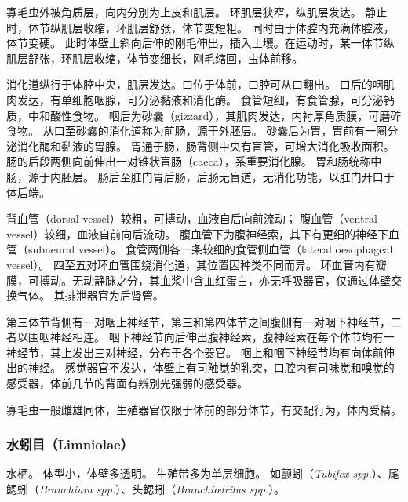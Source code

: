 \documentclass[11pt]{article}
\begin{document}
\newline

寡毛虫外被角质层，向内分别为上皮和肌层。
环肌层狭窄，纵肌层发达。
静止时，体节纵肌层收缩，环肌层舒张，体节变短粗。
同时由于体腔内充满体腔液，体节变硬。
此时体壁上斜向后伸的刚毛伸出，插入土壤。在运动时，某一体节纵肌层舒张，环肌层收缩，体节变细长，刚毛缩回，虫体前移。

\newline

消化道纵行于体腔中央，肌层发达。口位于体前，口腔可从口翻出。
口后的咽肌肉发达，有单细胞咽腺，可分泌黏液和消化酶。
食管短细，有食管腺，可分泌钙质，中和酸性食物。
咽后为砂囊（gizzard），其肌肉发达，内衬厚角质膜，可磨碎食物。
从口至砂囊的消化道称为前肠，源于外胚层。
砂囊后为胃，胃前有一圈分泌消化酶和黏液的胃腺。
胃通于肠，肠背侧中央有盲管，可增大消化吸收面积。
肠的后段两侧向前伸出一对锥状盲肠（caeca），系重要消化腺。
胃和肠统称中肠，源于内胚层。
肠后至肛门胃后肠，后肠无盲道，无消化功能，以肛门开口于体后端。

\newline

背血管（dorsal vessel）较粗，可搏动，血液自后向前流动；
腹血管（ventral vessel）较细，血液自前向后流动。
腹血管下为腹神经索，其下有更细的神经下血管（subneural vessel）。
食管两侧各一条较细的食管侧血管（lateral oesophageal vessel）。
四至五对环血管围绕消化道，其位置因种类不同而异。
环血管内有瓣膜，可搏动。无动静脉之分，其血浆中含血红蛋白，亦无呼吸器官，仅通过体壁交换气体。
其排泄器官为后肾管。

\newline

第三体节背侧有一对咽上神经节，第三和第四体节之间腹侧有一对咽下神经节，二者以围咽神经相连。
咽下神经节向后伸出腹神经索，腹神经索在每个体节均有一神经节，其上发出三对神经，分布于各个器官。
咽上和咽下神经节均有向体前伸出的神经。
感觉器官不发达，体壁上有司触觉的乳突，口腔内有司味觉和嗅觉的感受器，体前几节的背面有辨别光强弱的感受器。

\newline

寡毛虫一般雌雄同体，生殖器官仅限于体前的部分体节，有交配行为，体内受精。

\subsubsection{水蚓目（Limniolae）}
水栖。
体型小，体壁多透明。
生殖带多为单层细胞。
如颤蚓（\textit{Tubifex spp.}）、尾鳃蚓（\textit{Branchiura spp.}）、头鳃蚓（\textit{Branchiodrilus spp.}）。
\end{document}
